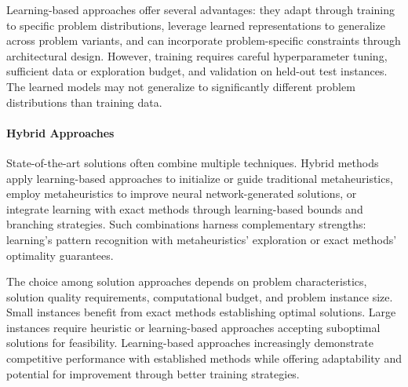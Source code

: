 Learning-based approaches offer several advantages: they adapt through training to specific problem distributions, leverage learned representations to generalize across problem variants, and can incorporate problem-specific constraints through architectural design. However, training requires careful hyperparameter tuning, sufficient data or exploration budget, and validation on held-out test instances. The learned models may not generalize to significantly different problem distributions than training data.

\paragraph{Hybrid Approaches}

State-of-the-art solutions often combine multiple techniques. Hybrid methods apply learning-based approaches to initialize or guide traditional metaheuristics, employ metaheuristics to improve neural network-generated solutions, or integrate learning with exact methods through learning-based bounds and branching strategies. Such combinations harness complementary strengths: learning's pattern recognition with metaheuristics' exploration or exact methods' optimality guarantees.

The choice among solution approaches depends on problem characteristics, solution quality requirements, computational budget, and problem instance size. Small instances benefit from exact methods establishing optimal solutions. Large instances require heuristic or learning-based approaches accepting suboptimal solutions for feasibility. Learning-based approaches increasingly demonstrate competitive performance with established methods while offering adaptability and potential for improvement through better training strategies.
